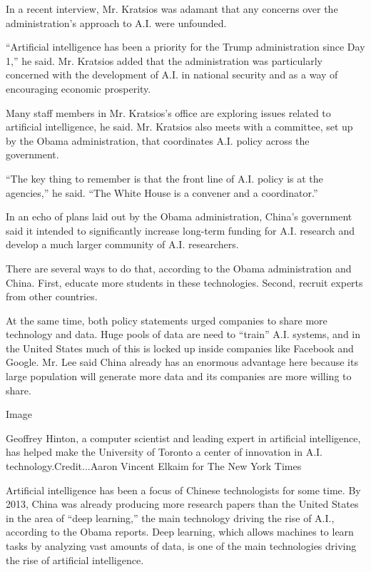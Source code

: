 In a recent interview, Mr. Kratsios was adamant that any concerns over
the administration's approach to A.I. were unfounded.

``Artificial intelligence has been a priority for the Trump
administration since Day 1,'' he said. Mr. Kratsios added that the
administration was particularly concerned with the development of A.I.
in national security and as a way of encouraging economic prosperity.

Many staff members in Mr. Kratsios's office are exploring issues related
to artificial intelligence, he said. Mr. Kratsios also meets with a
committee, set up by the Obama administration, that coordinates A.I.
policy across the government.

``The key thing to remember is that the front line of A.I. policy is at
the agencies,'' he said. ``The White House is a convener and a
coordinator.''

In an echo of plans laid out by the Obama administration, China's
government said it intended to significantly increase long-term funding
for A.I. research and develop a much larger community of A.I.
researchers.

There are several ways to do that, according to the Obama administration
and China. First, educate more students in these technologies. Second,
recruit experts from other countries.

At the same time, both policy statements urged companies to share more
technology and data. Huge pools of data are need to ``train'' A.I.
systems, and in the United States much of this is locked up inside
companies like Facebook and Google. Mr. Lee said China already has an
enormous advantage here because its large population will generate more
data and its companies are more willing to share.

Image

Geoffrey Hinton, a computer scientist and leading expert in artificial
intelligence, has helped make the University of Toronto a center of
innovation in A.I. technology.Credit...Aaron Vincent Elkaim for The New
York Times

Artificial intelligence has been a focus of Chinese technologists for
some time. By 2013, China was already producing more research papers
than the United States in the area of ``deep learning,'' the main
technology driving the rise of A.I., according to the Obama reports.
Deep learning, which allows machines to learn tasks by analyzing vast
amounts of data, is one of the main technologies driving the rise of
artificial intelligence.

